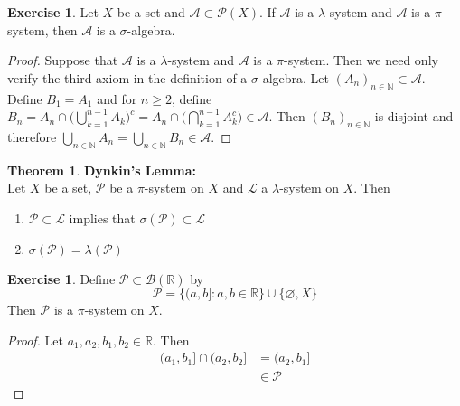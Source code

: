 \documentclass[12pt]{amsart}
\theoremstyle{definition}
\newtheorem{thm}[definition]{Theorem}
\newtheorem{ex}[definition]{Exercise}
\newcommand{\lam}{\lambda}
\newcommand{\sig}{\sigma}
\newcommand{\N}{\mathbb{N}}
\newcommand{\R}{\mathbb{R}}
\newcommand{\MA}{\mathcal{A}}
\newcommand{\MB}{\mathcal{B}}
\newcommand{\ML}{\mathcal{L}}
\newcommand{\MP}{\mathcal{P}}
\begin{document}
	\begin{ex}
		Let $X$ be a set and $\MA \subset \MP(X)$. If $\MA$ is a $\lam$-system and $\MA$ is a $\pi$-system, then $\MA$ is a $\sig$-algebra.
	\end{ex}
	
	\begin{proof}
		Suppose that $\MA$ is a $\lam$-system and $\MA$ is a $\pi$-system. Then we need only verify the third axiom in the definition of a $\sig$-algebra. Let $(A_n)_{n \in \N} \subset \MA$. Define $B_1 = A_1$ and for $n \geq 2$, define $B_n = A_n \cap \bigg( \bigcup\limits_{k=1}^{n-1}A_k \bigg)^c = A_n \cap \bigg( \bigcap\limits_{k=1}^{n-1}A_k^c \bigg) \in \MA$. Then $(B_n)_{n \in \N}$ is disjoint and therefore $\bigcup\limits_{n \in \N}A_n = \bigcup\limits_{n \in \N}B_n \in \MA$.
	\end{proof}
	
	\begin{thm} \textbf{Dynkin's Lemma:} \\
		Let $X$ be a set, $\MP$ be a $\pi$-system on $X$ and $\ML$ a $\lam$-system on $X$. Then
		\begin{enumerate}
			\item $\MP \subset \ML$ implies that $\sig(\MP) \subset \ML$ 
			\item $\sig(\MP) = \lam(\MP)$
		\end{enumerate} 
	\end{thm}
	
	\begin{ex}
		Define $\MP \subset \MB(\R)$ by $$\MP = \{(a,b]: a,b \in \R\} \cup \{\varnothing, X\}$$
		Then $\MP$ is a $\pi$-system on $X$.
	\end{ex}

	\begin{proof}
		Let $a_1, a_2, b_1, b_2 \in \R$. Then 
		\begin{align*}
			(a_1, b_1] \cap (a_2, b_2] 
			& = (a_2, b_1] \\
			& \in \MP
		\end{align*} 
	\end{proof}
\end{document}
